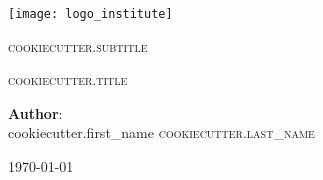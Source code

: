 \documentclass[{{cookiecutter.repo_name}}.tex]{subfiles}
\begin{document}
\begin{titlepage}


  	  \begin{minipage}{0.4\textwidth}
  		  \begin{flushright}
  			  \texttt{[image: logo\_institute]}
  		  \end{flushright}
   	  \end{minipage}

  	  \begin{center}
   		 \vfill
  	     \textsc{\Large {{cookiecutter.subtitle}} }\\ [1cm]


    	 {\Huge \textsc{ {{cookiecutter.title}} } \par}

  	    \vfill

      	 {\large \textbf{Author}:\\
	    	{{cookiecutter.first_name}} \textsc{ {{cookiecutter.last_name}} }\\[0.5cm]}

    	\vfill

   		{\large \today}
 	 \end{center}


\end{titlepage}
\end{document}
